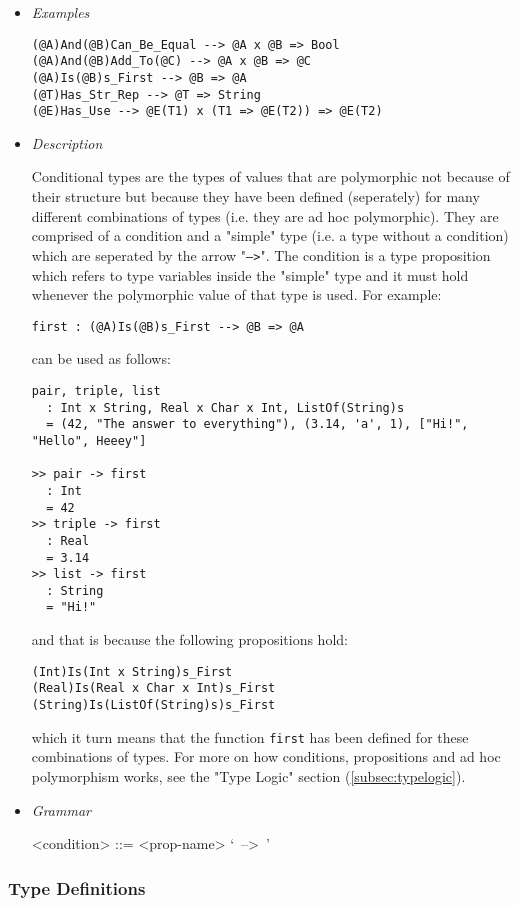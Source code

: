 \documentclass{article}
\begin{document}
\begin{itemize}
\item \textit{Examples}
\begin{verbatim}
(@A)And(@B)Can_Be_Equal --> @A x @B => Bool
(@A)And(@B)Add_To(@C) --> @A x @B => @C
(@A)Is(@B)s_First --> @B => @A
(@T)Has_Str_Rep --> @T => String
(@E)Has_Use --> @E(T1) x (T1 => @E(T2)) => @E(T2)
\end{verbatim}

\item \textit{Description}

Conditional types are the types of values that are polymorphic not because of
their structure but because they have been defined (seperately) for many
different combinations of types (i.e. they are ad hoc polymorphic). They are
comprised of a condition and a "simple" type (i.e. a type without a
condition) which are seperated by the arrow "\texttt{-->}". The condition is a
type proposition which refers to type variables inside the "simple" type
and it must hold whenever the polymorphic value of that type is used. For
example:
\begin{verbatim}
first : (@A)Is(@B)s_First --> @B => @A
\end{verbatim}
can be used as follows:
\begin{verbatim}
pair, triple, list
  : Int x String, Real x Char x Int, ListOf(String)s
  = (42, "The answer to everything"), (3.14, 'a', 1), ["Hi!", "Hello", Heeey"]

>> pair -> first
  : Int
  = 42
>> triple -> first
  : Real
  = 3.14
>> list -> first
  : String
  = "Hi!"
\end{verbatim}
and that is because the following propositions hold:
\begin{verbatim}
(Int)Is(Int x String)s_First
(Real)Is(Real x Char x Int)s_First
(String)Is(ListOf(String)s)s_First
\end{verbatim}
which it turn means that the function \texttt{first} has been defined
for these combinations of types. For more on how conditions, propositions and
ad hoc polymorphism works, see the "Type Logic" section (\ref{subsec:typelogic}).

\item \textit{Grammar}
\begin{grammar}
<condition> ::= <prop-name> `\ -->\ ' 
\end{grammar}

\end{itemize}

\subsubsection{Type Definitions}
\label{subsubsec:tdefs}
\end{document}
